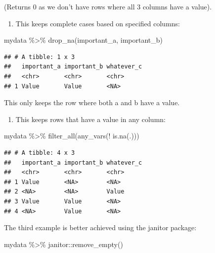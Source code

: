 \documentclass[
]{book}
\newenvironment{Shaded}{\begin{snugshade}}{\end{snugshade}}
\newcommand{\FunctionTok}[1]{\textcolor[rgb]{0.00,0.00,0.00}{#1}}
\newcommand{\NormalTok}[1]{#1}
\newcommand{\SpecialCharTok}[1]{\textcolor[rgb]{0.00,0.00,0.00}{#1}}
\providecommand{\tightlist}{%
  \setlength{\itemsep}{0pt}\setlength{\parskip}{0pt}}
\begin{document}
(Returns 0 as we don't have rows where all 3 columns have a value).

\begin{enumerate}
\def\labelenumi{(\arabic{enumi})}
\setcounter{enumi}{1}
\tightlist
\item
  This keeps complete cases based on specified columns:
\end{enumerate}

\begin{Shaded}
\begin{Highlighting}[]
\NormalTok{mydata }\SpecialCharTok{\%\textgreater{}\%} 
  \FunctionTok{drop\_na}\NormalTok{(important\_a, important\_b)}
\end{Highlighting}
\end{Shaded}

\begin{verbatim}
## # A tibble: 1 x 3
##   important_a important_b whatever_c
##   <chr>       <chr>       <chr>     
## 1 Value       Value       <NA>
\end{verbatim}

This only keeps the row where both a and b have a value.

\begin{enumerate}
\def\labelenumi{(\arabic{enumi})}
\setcounter{enumi}{2}
\tightlist
\item
  This keeps rows that have a value in any column:
\end{enumerate}

\begin{Shaded}
\begin{Highlighting}[]
\NormalTok{mydata }\SpecialCharTok{\%\textgreater{}\%} 
  \FunctionTok{filter\_all}\NormalTok{(}\FunctionTok{any\_vars}\NormalTok{(}\SpecialCharTok{!} \FunctionTok{is.na}\NormalTok{(.)))}
\end{Highlighting}
\end{Shaded}

\begin{verbatim}
## # A tibble: 4 x 3
##   important_a important_b whatever_c
##   <chr>       <chr>       <chr>     
## 1 Value       <NA>        <NA>      
## 2 <NA>        <NA>        Value     
## 3 Value       Value       <NA>      
## 4 <NA>        Value       <NA>
\end{verbatim}

The third example is better achieved using the janitor package:

\begin{Shaded}
\begin{Highlighting}[]
\NormalTok{mydata }\SpecialCharTok{\%\textgreater{}\%} 
\NormalTok{  janitor}\SpecialCharTok{::}\FunctionTok{remove\_empty}\NormalTok{()}
\end{Highlighting}
\end{Shaded}
\end{document}
